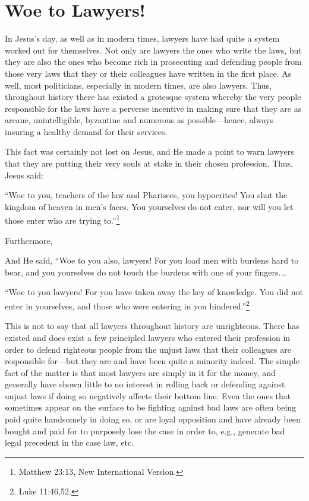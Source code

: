 \documentclass[letterpaper,12pt]{article}
\newenvironment{squote}
  {\small\quote}
  {\endquote\normalsize}
\newenvironment{squotation}
  {\small\quotation}
  {\endquotation\normalsize}
\begin{document}
\section{Woe to Lawyers!}
\label{sec:WoeToLawyers}

In Jesus's day, as well as in modern times, lawyers have had quite a system worked out for themselves. Not only are lawyers the ones who write the laws, but they are also the ones who become rich in prosecuting and defending people from those very laws that they or their colleagues have written in the first place. As well, most politicians, especially in modern times, are also lawyers. Thus, throughout history there has existed a grotesque system whereby the very people responsible for the laws have a perverse incentive in making sure that they are as arcane, unintelligible, byzantine and numerous as possible---hence, always insuring a healthy demand for their services.

This fact was certainly not lost on Jesus, and He made a point to warn lawyers that they are putting their very souls at stake in their chosen profession. Thus, Jesus said:

\begin{squote}
``Woe to you, teachers of the law and Pharisees, you hypocrites! You shut the kingdom of heaven in men's faces. You yourselves do not enter, nor will you let those enter who are trying to.''\footnote{Matthew 23:13, New International Version.}
\end{squote}

Furthermore,

\begin{squotation}
And He said, ``Woe to you also, lawyers! For you load men with burdens hard to bear, and you yourselves do not touch the burdens with one of your fingers\mbox{.\hspace{0.167em}\ldots}

``Woe to you lawyers! For you have taken away the key of knowledge. You did not enter in yourselves, and those who were entering in you hindered.''\footnote{Luke 11:46,52.}
\end{squotation}

This is not to say that all lawyers throughout history are unrighteous. There has existed and does exist a few principled lawyers who entered their profession in order to defend righteous people from the unjust laws that their colleagues are responsible for---but they are and have been quite a minority indeed. The simple fact of the matter is that most lawyers are simply in it for the money, and generally have shown little to no interest in rolling back or defending against unjust laws if doing so negatively affects their bottom line. Even the ones that sometimes appear on the surface to be fighting against bad laws are often being paid quite handsomely in doing so, or are loyal opposition and have already been bought and paid for to purposely lose the case in order to, e.g., generate bad legal precedent in the case law, etc.
\end{document}
